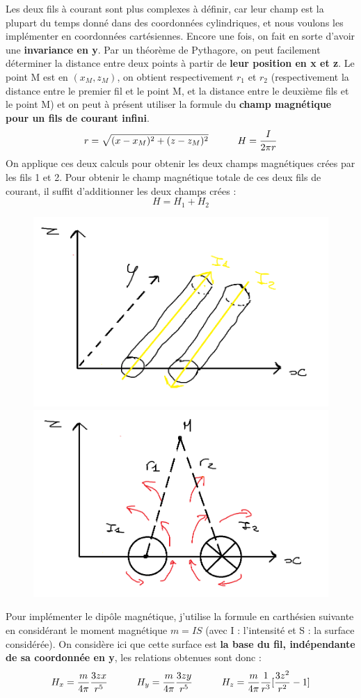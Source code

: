 \documentclass{article}
\begin{document}
Les deux fils à courant sont plus complexes à définir, car leur champ est la plupart du temps donné dans des coordonnées cylindriques, et nous voulons les implémenter en coordonnées cartésiennes. Encore une fois, on fait en sorte d'avoir une \textbf{invariance en y}. Par un théorème de Pythagore, on peut facilement déterminer la distance entre deux points à partir de \textbf{leur position en x et z}. Le point M est en $(x_{M},z_{M})$, on obtient respectivement $r_{1}$ et $r_{2}$ (respectivement la distance entre le premier fil et le point M, et la distance entre le deuxième fils et le point M) et on peut à présent utiliser la formule du \textbf{champ magnétique pour un fils de courant infini}.
\begin{equation}
r = \sqrt{(x-x_{M})^2 + (z-z_{M})^2} \indent\indent H = \frac{I}{2\pi r}
\label{eq02}
\end{equation}
On applique ces deux calculs pour obtenir les deux champs magnétiques crées par les fils 1 et 2. Pour obtenir le champ magnétique totale de ces deux fils de courant, il suffit d'additionner les deux champs crées :
\begin{equation}
H = H_{1} + H_{2}
\label{eq03}
\end{equation}
\begin{figure}[h]
	\centering
    \includegraphics[width=.4\linewidth]{Fils.png}
    \includegraphics[width=.4\linewidth]{Fils2.png}
\end{figure}
\newpage
Pour implémenter le dipôle magnétique, j'utilise la formule en carthésien suivante en considérant le moment magnétique $m = IS$ (avec I : l'intensité et S : la surface considérée). On considère ici que cette surface est \textbf{la base du fil, indépendante de sa coordonnée en y}, les relations obtenues sont donc :
\begin{equation}
H_{x} = \frac{m}{4\pi}\frac{3zx}{r^5}\indent\indent H_{y} = \frac{m}{4\pi}\frac{3zy}{r^5}\indent\indent H_{z}=\frac{m}{4\pi}\frac{1}{r^3}[\frac{3z^2}{r^2} - 1]
\label{eq04}
\end{equation}
\end{document}
